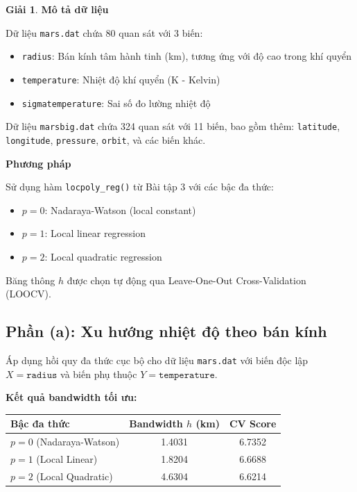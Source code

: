 \documentclass[12pt,xcolor=dvipsnames]{article}
\theoremstyle{definition}
\newtheorem*{giai}{Giải}
\begin{document}
\begin{giai}

\textbf{Mô tả dữ liệu}

Dữ liệu \texttt{mars.dat} chứa 80 quan sát với 3 biến:
\begin{itemize}
    \item \texttt{radius}: Bán kính tâm hành tinh (km), tương ứng với độ cao trong khí quyển
    \item \texttt{temperature}: Nhiệt độ khí quyển (K - Kelvin)
    \item \texttt{sigmatemperature}: Sai số đo lường nhiệt độ
\end{itemize}

Dữ liệu \texttt{marsbig.dat} chứa 324 quan sát với 11 biến, bao gồm thêm: \texttt{latitude}, \texttt{longitude}, \texttt{pressure}, \texttt{orbit}, và các biến khác.

\textbf{Phương pháp}

Sử dụng hàm \texttt{locpoly\_reg()} từ Bài tập 3 với các bậc đa thức:
\begin{itemize}
    \item $p=0$: Nadaraya-Watson (local constant)
    \item $p=1$: Local linear regression
    \item $p=2$: Local quadratic regression
\end{itemize}

Băng thông $h$ được chọn tự động qua Leave-One-Out Cross-Validation (LOOCV).

\subsection*{Phần (a): Xu hướng nhiệt độ theo bán kính}

Áp dụng hồi quy đa thức cục bộ cho dữ liệu \texttt{mars.dat} với biến độc lập $X = \texttt{radius}$ và biến phụ thuộc $Y = \texttt{temperature}$.

\textbf{Kết quả bandwidth tối ưu:}
\begin{center}
\begin{tabular}{lcc}
\toprule
Bậc đa thức & Bandwidth $h$ (km) & CV Score \\
\midrule
$p=0$ (Nadaraya-Watson) & 1.4031 & 6.7352 \\
$p=1$ (Local Linear) & 1.8204 & 6.6688 \\
$p=2$ (Local Quadratic) & 4.6304 & 6.6214 \\
\bottomrule
\end{tabular}
\end{center}


\end{giai}
\end{document}
